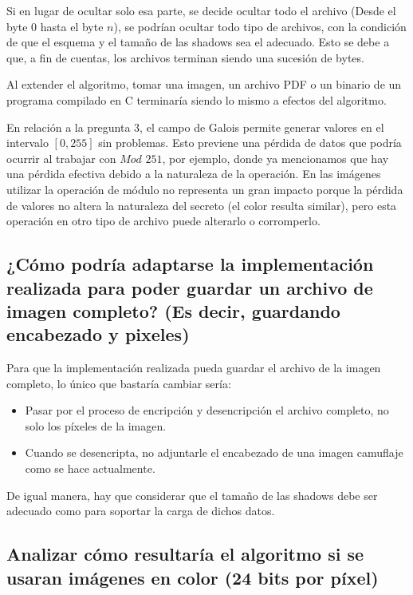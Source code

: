 \documentclass[11pt]{scrartcl} %
\begin{document}
Si en lugar de ocultar solo esa parte, se decide ocultar todo el archivo (Desde el byte $0$ hasta el byte $n$), se podrían ocultar todo tipo de archivos, con la condición de que el esquema y el tamaño de las shadows sea el adecuado. Esto se debe a que, a fin de cuentas, los archivos terminan siendo una sucesión de bytes.

Al extender el algoritmo, tomar una imagen, un archivo PDF o un binario de un programa compilado en C terminaría siendo lo mismo a efectos del algoritmo.

En relación a la pregunta 3, el campo de Galois permite generar valores en el intervalo $[0, 255]$ sin problemas. Esto previene una pérdida de datos que podría ocurrir al trabajar con $Mod$ $251$, por ejemplo, donde ya mencionamos que hay una pérdida efectiva debido a la naturaleza de la operación. En las imágenes utilizar la operación de módulo no representa un gran impacto porque la pérdida de valores no altera la naturaleza del secreto (el color resulta similar), pero esta operación en otro tipo de archivo puede alterarlo o corromperlo.


\subsection{¿Cómo podría adaptarse la implementación realizada para poder guardar un archivo de imagen completo? (Es decir, guardando encabezado y pixeles)}

Para que la implementación realizada pueda guardar el archivo de la imagen completo, lo único que bastaría cambiar sería:

\begin{itemize}
  \item Pasar por el proceso de encripción y desencripción el archivo completo, no solo los píxeles de la imagen.
  \item Cuando se desencripta, no adjuntarle el encabezado de una imagen camuflaje como se hace actualmente.
\end{itemize}

De igual manera, hay que considerar que el tamaño de las shadows debe ser adecuado como para soportar la carga de dichos datos.


\subsection{Analizar cómo resultaría el algoritmo si se usaran imágenes en color (24 bits por píxel)}
\end{document}
